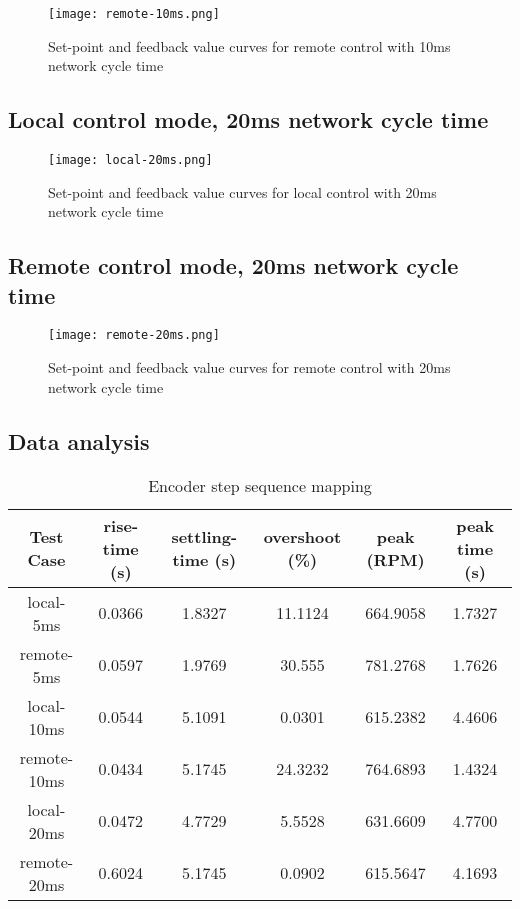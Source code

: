 \begin{figure}[!h]
	\centering
	\texttt{[image: remote-10ms.png]}
	\caption{Set-point and feedback value curves for remote control with 10ms network cycle time}
	\label{fig:remote-10ms}
\end{figure}

\subsection{Local control mode, 20ms network cycle time}

\begin{figure}[!h]
	\centering
	\texttt{[image: local-20ms.png]}
	\caption{Set-point and feedback value curves for local control with 20ms network cycle time}
	\label{fig:local-20ms}
\end{figure}

\subsection{Remote control mode, 20ms network cycle time}

\begin{figure}[!h]
	\centering
	\texttt{[image: remote-20ms.png]}
	\caption{Set-point and feedback value curves for remote control with 20ms network cycle time}
	\label{fig:remote-20ms}
\end{figure}

\subsection{Data analysis}

\begin{table}[htp]
	\centering
	\caption{Encoder step sequence mapping}
	\begin{tabular}{|c|c|c|c|c|c|}
		\hline
		Test Case   & rise-time (s) & settling-time (s) & overshoot (\%) & peak (RPM) & peak time (s) \\
		\hline
		local-5ms   & 0.0366 & 1.8327 & 11.1124 & 664.9058 & 1.7327 \\
		\hline
		remote-5ms  & 0.0597 & 1.9769 & 30.555 & 781.2768 & 1.7626 \\
		\hline
		local-10ms  & 0.0544 & 5.1091 & 0.0301 & 615.2382 & 4.4606 \\
		\hline
		remote-10ms & 0.0434 & 5.1745 & 24.3232 & 764.6893 & 1.4324 \\
		\hline
		local-20ms  & 0.0472 & 4.7729 & 5.5528 & 631.6609 & 4.7700 \\
		\hline
		remote-20ms & 0.6024 & 5.1745 & 0.0902 & 615.5647 & 4.1693 \\
		\hline
	\end{tabular}
\end{table}
